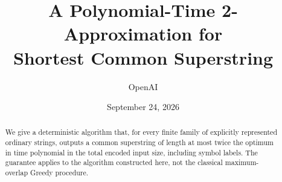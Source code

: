 \documentclass[11pt]{article}
\title{A Polynomial-Time 2-Approximation for\protect\\ Shortest Common Superstring}
\author{OpenAI}
\date{September 24, 2026}
\numberwithin{equation}{section}
\theoremstyle{definition}
\begin{document}
\maketitle
\begin{abstract}
We give a deterministic algorithm that, for every finite family of explicitly
represented ordinary strings, outputs a common superstring of length at most
twice the optimum in time polynomial in the total encoded input size, including
symbol labels. The guarantee applies to the algorithm constructed here, not the
classical maximum-overlap Greedy procedure.
\end{abstract}








\end{document}
